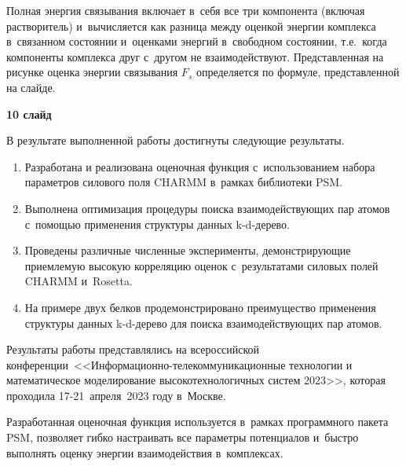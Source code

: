 \documentclass[30pt]{article}
\begin{document}
Полная энергия связывания включает в~себя все три компонента (включая растворитель) и~вычисляется как разница между оценкой энергии комплекса в~связанном состоянии и~оценками энергий в~свободном состоянии, т.е.~когда компоненты комплекса друг с~другом не взаимодействуют. Представленная на рисунке оценка энергии связывания $F_s$ определяется по формуле, представленной на слайде.

\vspace{+5mm}


\textbf{10 слайд}

В результате выполненной работы достигнуты следующие результаты.

\begin{enumerate}
	\item Разработана и реализована оценочная функция с~использованием набора параметров силового поля CHARMM в~рамках библиотеки PSM.
	\item Выполнена оптимизация процедуры поиска взаимодействующих пар атомов с~помощью применения структуры данных k-d-дерево.
	\item Проведены различные численные эксперименты, демонстрирующие приемлемую высокую корреляцию оценок с~результатами силовых полей CHARMM и~Rosetta.
	\item На примере двух белков продемонстрировано преимущество применения структуры данных k-d-дерево для поиска взаимодействующих пар атомов.
\end{enumerate}

Результаты работы представлялись на всероссийской конференции~<<Информационно-телекоммуникационные технологии и математическое моделирование высокотехнологичных систем 2023>>, которая проходила 17-21~апреля~2023 году в~Москве.

Разработанная оценочная функция используется в~рамках программного пакета PSM, позволяет гибко настраивать все параметры потенциалов и~быстро выполнять оценку энергии взаимодействия в~комплексах.
\end{document}
